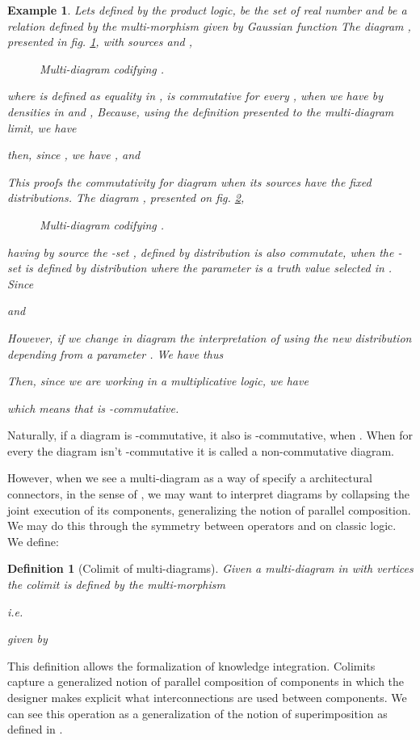 \documentclass[oribibl]{llncs}
\newtheorem{defn}{Definition}
\newtheorem{exam}{Example}
\begin{document}
\begin{exam} Lets  defined by the product logic,  be the set of real number and  be a relation defined by the multi-morphism  given by Gaussian function   The diagram , presented in fig. \ref{equation1}, with sources  and ,
\begin{figure}[h]

\caption{Multi-diagram  codifying .}\label{equation1}
\end{figure}
where  is defined as equality in , is commutative for every , when we have by densities in  and , 
Because, using the definition presented to the multi-diagram limit, we have

then, since , we have , and

This proofs the commutativity for diagram  when its sources have the fixed distributions. The diagram , presented on fig. \ref{equation2},
\begin{figure}[h]

\caption{Multi-diagram  codifying .}\label{equation2}
\end{figure}
having by source the -set , defined by distribution   
is also commutate, when the -set  is defined by distribution
 where the parameter  is a truth value selected in . Since

and

However, if we change in diagram  the interpretation of  using the new distribution
 depending from a parameter . We have
 thus

Then, since we are working in a multiplicative logic, we have

which means that  is -commutative.
\end{exam}

Naturally, if a diagram is -commutative, it also is -commutative, when . When for every  the diagram isn't -commutative it is called a non-commutative diagram.

However, when we see a multi-diagram as a way of specify a architectural connectors, in the sense of \cite{Backhouse03}, we may want to interpret diagrams by collapsing the joint execution of its components, generalizing the notion of parallel composition.  We may do this through the symmetry between operators  and  on classic logic. We define:

\begin{defn}[Colimit of multi-diagrams]\label{colim}
Given a multi-diagram  in  with vertices  the colimit is defined by the multi-morphism

i.e.
 
given by

\end{defn}
This definition allows the formalization of knowledge integration. Colimits capture a generalized notion of parallel composition of components in which the designer makes explicit what interconnections are used between components. We can see this operation as a generalization of the notion of superimposition as defined in \cite{Bosch99}.
\end{document}
